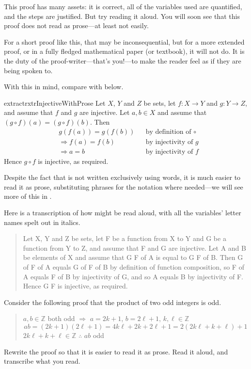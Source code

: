 This proof has many assets: it is correct, all of the variables used are quantified, and the steps are justified. But try reading it aloud. You will soon see that this proof does not read as prose---at least not easily.

For a short proof like this, that may be inconsequential, but for a more extended proof, or in a fully fledged mathematical paper (or textbook), it will not do. It is the duty of the proof-writer---that's you!---to make the reader feel as if they are being spoken to.

With this in mind, compare  with  below.

\begin{restatable}{extract}{rxtrInjectiveWithProse}
\label{xtrInjectiveWithProse}
Let $X$, $Y$ and $Z$ be sets, let $f : X \to Y$ and $g : Y \to Z$, and assume that $f$ and $g$ are injective. Let $a,b \in X$ and assume that $(g \circ f)(a) = (g \circ f)(b)$. Then
\begin{align*}
& g(f(a)) = g(f(b)) && \text{by definition of $\circ$} \\
& \Rightarrow f(a) = f(b) && \text{by injectivity of $g$} \\
& \Rightarrow a = b && \text{by injectivity of $f$}
\end{align*}
Hence $g \circ f$ is injective, as required.
\end{restatable}

Despite the fact that  is not written exclusively using words, it is much easier to read it as prose, substituting phrases for the notation where needed---we will see more of this in .

Here is a transcription of how  might be read aloud, with all the variables' letter names spelt out in italics.

\begin{quote}
Let X, Y and Z be sets, let F be a function from X to Y and G be a function from Y to Z, and assume that F and G are injective. Let A and B be elements of X and assume that G F of A is equal to G F of B. Then G of F of A equals G of F of B by definition of function composition, so F of A equals F of B by injectivity of G, and so A equals B by injectivity of F. Hence G F is injective, as required.
\end{quote}

\begin{exercise}
Consider the following proof that the product of two odd integers is odd.
\begin{quote}
$a,b \in \mathbb{Z}$ both odd $\Rightarrow$ $a=2k+1$, $b=2\ell+1$, $k,\ell \in \mathbb{Z}$
\[ ab = (2k+1)(2\ell+1) = 4k\ell+2k+2\ell+1 = 2(2k\ell+k+\ell)+1\]
$2k\ell + k + \ell \in \mathbb{Z}$ $\therefore$ $ab$ odd
\end{quote}
Rewrite the proof so that it is easier to read it as prose. Read it aloud, and transcribe what you read.
\end{exercise}

